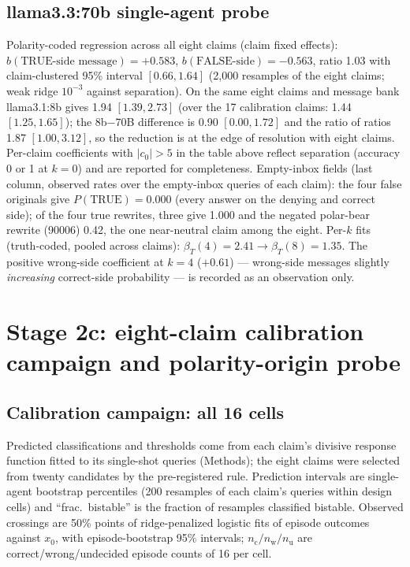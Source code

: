\documentclass[11pt]{article}
\begin{document}
\subsection{llama3.3:70b single-agent probe}
\begin{center}

\end{center}
Polarity-coded regression across all eight claims (claim fixed effects):
$b(\text{TRUE-side message}) = +0.583$, $b(\text{FALSE-side}) = -0.563$,
ratio 1.03 with claim-clustered 95\% interval $[0.66, 1.64]$ (2{,}000
resamples of the eight claims; weak ridge $10^{-3}$ against separation). On
the same eight claims and message bank llama3.1:8b gives 1.94 $[1.39, 2.73]$
(over the 17 calibration claims: 1.44 $[1.25, 1.65]$); the 8b$-$70B
difference is 0.90 $[0.00, 1.72]$ and the ratio of ratios 1.87
$[1.00, 3.12]$, so the reduction is at the edge of resolution with eight
claims. Per-claim coefficients with $|c_0| > 5$ in the table above reflect
separation (accuracy 0 or 1 at $k = 0$) and are reported for completeness.
Empty-inbox fields (last column, observed rates over the empty-inbox
queries of each claim): the four false originals give
$P(\mathrm{TRUE}) = 0.000$ (every answer on the denying and correct side); of
the four true rewrites, three give 1.000 and the negated polar-bear rewrite
(90006) 0.42, the one near-neutral claim among the eight.
Per-$k$ fits (truth-coded, pooled across claims):
$\beta_T(4) = 2.41 \to \beta_T(8) = 1.35$. The positive wrong-side
coefficient at $k = 4$ ($+0.61$) --- wrong-side messages slightly
\emph{increasing} correct-side probability --- is recorded as an observation
only.

\section{Stage 2c: eight-claim calibration campaign and polarity-origin probe}

\subsection{Calibration campaign: all 16 cells}

Predicted classifications and thresholds come from each claim's divisive
response function fitted to its single-shot queries (Methods); the eight
claims were selected from twenty candidates by the pre-registered rule.
Prediction intervals are single-agent bootstrap percentiles (200 resamples
of each claim's queries within design cells) and ``frac.\ bistable'' is the
fraction of resamples classified bistable. Observed crossings are 50\% points
of ridge-penalized logistic fits of episode outcomes against $x_0$, with
episode-bootstrap 95\% intervals;
$n_{\mathrm{c}}/n_{\mathrm{w}}/n_{\mathrm{u}}$ are correct/wrong/undecided
episode counts of 16 per cell.
\end{document}

